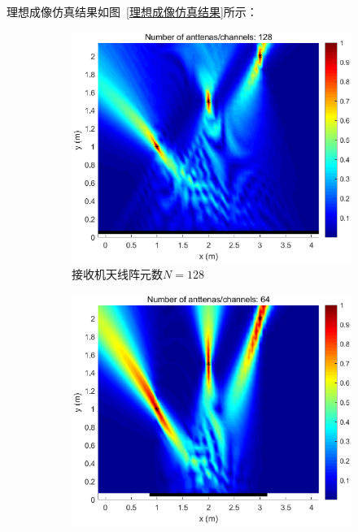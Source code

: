 理想成像仿真结果如图~\ref{理想成像仿真结果}所示：

\begin{figure}[htb]
  \centering
  \begin{subfigure}[t]{.45\linewidth}
      \centering
      \includegraphics[width=1\textwidth]{figures/expected/128.eps}
      \caption{接收机天线阵元数$N=128$}
  \end{subfigure}
  \begin{subfigure}[t]{.45\linewidth}
      \centering
      \includegraphics[width=1\textwidth]{figures/expected/64.eps}

\end{subfigure}
\end{figure}
